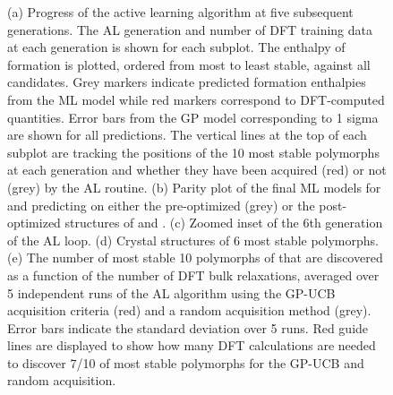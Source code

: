 \begin{figure}[!htb]
\centering
{}
\caption{\label{fig:iro2_al}
(a) Progress of the active learning algorithm at five subsequent generations.
%
The AL generation and number of DFT training data at each generation is shown for each subplot.
%
The enthalpy of formation is plotted, ordered from most to least stable, against all \IrOthree candidates.
%
Grey markers indicate predicted formation enthalpies from the ML model while red markers correspond to DFT-computed quantities.
%
Error bars from the GP model corresponding to 1 sigma are shown for all predictions.
%
The vertical lines at the top of each subplot are tracking the positions of the \num{10} most stable polymorphs at each generation and whether they have been acquired (red) or not (grey) by the AL routine.
(b) Parity plot of the final ML models for \IrOtwo and \IrOthree predicting on either the pre-optimized (grey) or the post-optimized structures of \IrOtwo and \IrOthree.
(c) Zoomed inset of the 6th generation of the AL loop.
(d) Crystal structures of \num{6} most stable \IrOthree polymorphs.
(e) The number of most stable \num{10} polymorphs of \IrOthree that are discovered as a function of the number of DFT bulk relaxations, averaged over \num{5} independent runs of the AL algorithm using the GP-UCB acquisition criteria (red) and a random acquisition method (grey).
%
Error bars indicate the standard deviation over \num{5} runs.
%
Red guide lines are displayed to show how many DFT calculations are needed to discover \num{7/10} of most stable polymorphs for the GP-UCB and random acquisition.
}
\end{figure}


